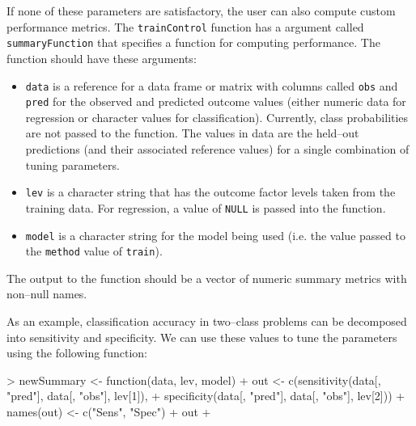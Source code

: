 \documentclass[12pt]{article}
\begin{document}
If none of these parameters are satisfactory, the user can also compute custom performance metrics. The \texttt{trainControl} function has a argument called \texttt{summaryFunction} that specifies a function for computing performance. The function should have these arguments:
\begin{itemize}
\item \texttt{data} is a reference for a data frame or matrix with columns called \texttt{obs} and \texttt{pred} for the observed and predicted outcome values (either numeric data for regression or character values for classification). Currently, class probabilities are not passed to the function. The values in data are the held--out predictions (and their associated reference values) for a single combination of tuning parameters.
\item \texttt{lev} is a character string that has the outcome factor levels taken from the training data. For regression, a value of \texttt{NULL} is passed into the function.
\item \texttt{model} is a character string for the model being used (i.e. the value passed to the \texttt{method} value of \texttt{train}).
\end{itemize}
The output to the function should be a vector of numeric summary metrics with non--null names. 

As an example, classification accuracy in two--class problems can be decomposed into sensitivity and specificity. We can use these values to tune the parameters using the following function:
\begin{Schunk}
\begin{Sinput}
> newSummary <- function(data, lev, model) {
+     out <- c(sensitivity(data[, "pred"], data[, "obs"], lev[1]), 
+         specificity(data[, "pred"], data[, "obs"], lev[2]))
+     names(out) <- c("Sens", "Spec")
+     out
+ }
\end{Sinput}
\end{Schunk}
\end{document}
